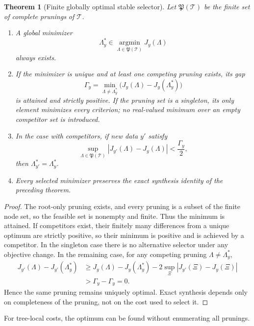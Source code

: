 \documentclass[11pt,letterpaper]{article}
\newtheorem{theorem}{Theorem}[section]
\theoremstyle{plain}
\theoremstyle{plain}
\theoremstyle{plain}
\theoremstyle{definition}
\theoremstyle{definition}
\theoremstyle{definition}
\theoremstyle{definition}
\theoremstyle{remark}
\theoremstyle{remark}
\theoremstyle{remark}
\theoremstyle{remark}
\begin{document}
\begin{theorem}[Finite globally optimal stable selector]\label{result:14}
Let $\mathfrak P(\mathcal T)$ be the finite set of complete prunings of $\mathcal T$.

\begin{enumerate}[label=(\roman*)]
\item A global minimizer
\[
\Lambda_y^*\in\operatorname*{argmin}_{\Lambda\in\mathfrak P(\mathcal T)}J_y(\Lambda)
\]
always exists.
\item If the minimizer is unique and at least one competing pruning exists, its gap
\[
\Gamma_y
=
\min_{\Lambda\ne\Lambda_y^*}
\bigl(J_y(\Lambda)-J_y(\Lambda_y^*)\bigr)
\]
is attained and strictly positive. If the pruning set is a singleton, its only element minimizes every criterion; no real-valued minimum over an empty competitor set is introduced.
\item In the case with competitors, if new data $y'$ satisfy
\[
\sup_{\Lambda\in\mathfrak P(\mathcal T)}
|J_{y'}(\Lambda)-J_y(\Lambda)|
<\frac{\Gamma_y}{2},
\]
then $\Lambda_{y'}^*=\Lambda_y^*$.
\item Every selected minimizer preserves the exact synthesis identity of the preceding theorem.
\end{enumerate}
\end{theorem}

\begin{proof}
The root-only pruning exists, and every pruning is a subset of the finite node set, so the feasible set is nonempty and finite. Thus the minimum is attained. If competitors exist, their finitely many differences from a unique optimum are strictly positive, so their minimum is positive and is achieved by a competitor. In the singleton case there is no alternative selector under any objective change. In the remaining case, for any competing pruning $\Lambda\ne\Lambda_y^*$,
\[
\begin{aligned}
J_{y'}(\Lambda)-J_{y'}(\Lambda_y^*)
&\ge
J_y(\Lambda)-J_y(\Lambda_y^*)
-2\sup_{\Xi}|J_{y'}(\Xi)-J_y(\Xi)|\\
&>\Gamma_y-\Gamma_y=0.
\end{aligned}
\]
Hence the same pruning remains uniquely optimal.  Exact synthesis depends only on completeness of the pruning, not on the cost used to select it.
\end{proof}

For tree-local costs, the optimum can be found without enumerating all prunings.
\end{document}
